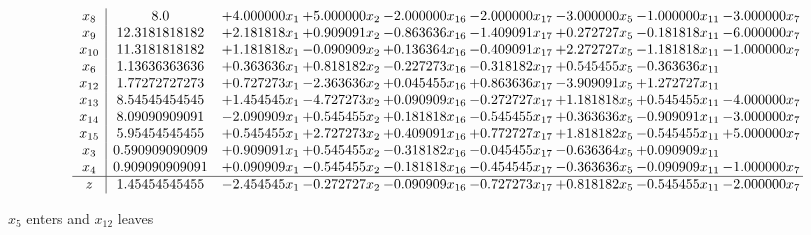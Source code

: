 \documentclass[10pt]{article}
\begin{document}
 \[\begin{array}{c| c c@{\hskip 2pt} c@{\hskip 2pt} c@{\hskip 2pt} c@{\hskip 2pt} c@{\hskip 2pt} c@{\hskip 2pt} c@{\hskip 2pt} }
 x_{8}   &  8.0 & + 4.000000 x_{1} & + 5.000000 x_{2} & -2.000000 x_{16} & -2.000000 x_{17} & -3.000000 x_{5} & -1.000000 x_{11} & -3.000000 x_{7}\\
 x_{9}   &  12.3181818182 & + 2.181818 x_{1} & + 0.909091 x_{2} & -0.863636 x_{16} & -1.409091 x_{17} & + 0.272727 x_{5} & -0.181818 x_{11} & -6.000000 x_{7}\\
 x_{10}   &  11.3181818182 & + 1.181818 x_{1} & -0.090909 x_{2} & + 0.136364 x_{16} & -0.409091 x_{17} & + 2.272727 x_{5} & -1.181818 x_{11} & -1.000000 x_{7}\\
 x_{6}   &  1.13636363636 & + 0.363636 x_{1} & + 0.818182 x_{2} & -0.227273 x_{16} & -0.318182 x_{17} & + 0.545455 x_{5} & -0.363636 x_{11} &   \\
 x_{12}   &  1.77272727273 & + 0.727273 x_{1} & -2.363636 x_{2} & + 0.045455 x_{16} & + 0.863636 x_{17} & -3.909091 x_{5} & + 1.272727 x_{11} &   \\
 x_{13}   &  8.54545454545 & + 1.454545 x_{1} & -4.727273 x_{2} & + 0.090909 x_{16} & -0.272727 x_{17} & + 1.181818 x_{5} & + 0.545455 x_{11} & -4.000000 x_{7}\\
 x_{14}   &  8.09090909091 & -2.090909 x_{1} & + 0.545455 x_{2} & + 0.181818 x_{16} & -0.545455 x_{17} & + 0.363636 x_{5} & -0.909091 x_{11} & -3.000000 x_{7}\\
 x_{15}   &  5.95454545455 & + 0.545455 x_{1} & + 2.727273 x_{2} & + 0.409091 x_{16} & + 0.772727 x_{17} & + 1.818182 x_{5} & -0.545455 x_{11} & + 5.000000 x_{7}\\
 x_{3}   &  0.590909090909 & + 0.909091 x_{1} & + 0.545455 x_{2} & -0.318182 x_{16} & -0.045455 x_{17} & -0.636364 x_{5} & + 0.090909 x_{11} &   \\
 x_{4}   &  0.909090909091 & + 0.090909 x_{1} & -0.545455 x_{2} & -0.181818 x_{16} & -0.454545 x_{17} & -0.363636 x_{5} & -0.090909 x_{11} & -1.000000 x_{7}\\
\hline
z    &  1.45454545455 & -2.454545 x_{1} & -0.272727 x_{2} & -0.090909 x_{16} & -0.727273 x_{17} & + 0.818182 x_{5} & -0.545455 x_{11} & -2.000000 x_{7}\\
\end{array}\]


 $ x_{5} $ enters and $ x_{12} $ leaves 
\end{document}
